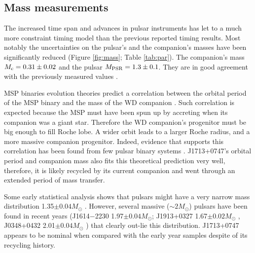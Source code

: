 
\subsection{Mass measurements}
\label{sec:mass}
The increased time span and advances in pulsar instruments has let to a much
more constraint timing model than the previous reported timing results. Most
notably the uncertainties on the pulsar's and the companion's masses have been
significantly reduced (Figure \ref{fig:mass}; Table \ref{tab:par}). The
companion's mass $M_{\rm c} = 0.31\pm0.02$ and the pulsar $M_{\rm PSR}=1.3\pm0.1$. They are in
good agreement with the previously measured values \cite{sns+05}.

MSP binaries evolution theories predict 
a correlation between the orbital period
of the MSP binary and the mass of the WD companion \citep{rpj+95, ts99a, prp02b}
. Such correlation is expected because the MSP must have been spun up by
accreting when its companion was a giant star. Therefore the WD
companion's progenitor must be big enough to fill Roche lobe. A wider
orbit leads to a larger Roche radius, and a more massive companion progenitor.
Indeed, evidence that supports this correlation has been found from few pulsar
binary systems \citep{vbb+01, ktr94}.  
J1713+0747's orbital period and companion mass also fits this theoretical
prediction very well, therefore, it is likely recycled by its current
companion and went through an extended period of mass transfer.

Some early statistical analysis shows that pulsars 
might have a very narrow mass distribution 1.35$\pm0.04M_{\odot}$ \citep{tc99}. 
However, several massive ($\sim2M_{\odot}$) pulsars have been found in recent
years (J1614$-$2230 1.97$\pm0.04M_{\odot}$\citealt{dpr+10}; J1913+0327
1.67$\pm0.02M_{\odot}$ \citealt{fbw+11}, J0348+0432 2.01$\pm0.04M_{\odot}$
\citealt{afw+13}) that clearly out-lie this distribution.
J1713+0747 appears to be nominal when compared with the early year samples
despite of its recycling history.


